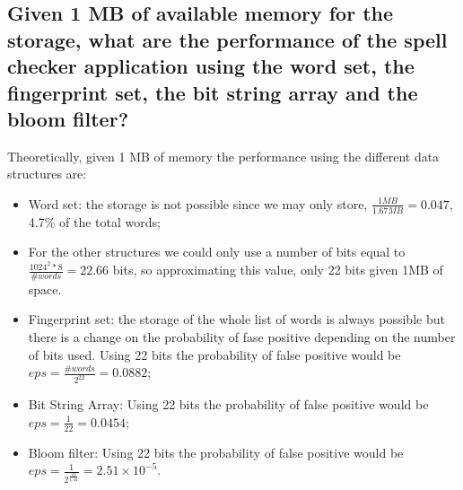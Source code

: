 \documentclass{report}
\begin{document}
{				\subsection{Given 1 MB of available memory for the storage, what are the performance of the spell checker application using the word set, the fingerprint set, the bit string array and the bloom filter?}
				Theoretically, given 1 MB of memory the performance using the different data structures are:
				\begin{itemize}
					\item Word set: the storage is not possible since we may only store, $\frac{1MB}{1.67MB}=0.047$, 4.7\% of the total words;
					\item[] For the other structures we could only use a number of bits equal to $\frac{1024^2*8}{\#words}=22.66$ bits, so approximating this value, only 22 bits given 1MB of space.
					\item Fingerprint set: the storage of the whole list of words is always possible but there is a change on the probability of fase positive depending on the number of bits used. Using 22 bits the probability of false positive would be $eps=\frac{\#words}{2^{22}}=0.0882$; 
					\item Bit String Array: Using 22 bits the probability of false positive would be $eps=\frac{1}{22}=0.0454$;
					\item Bloom filter: Using 22 bits the probability of false positive would be $eps=\frac{1}{2^{\frac{22}{1.44}}}=2.51 \times 10^{-5}$. 
				\end{itemize}
				

}
\end{document}

